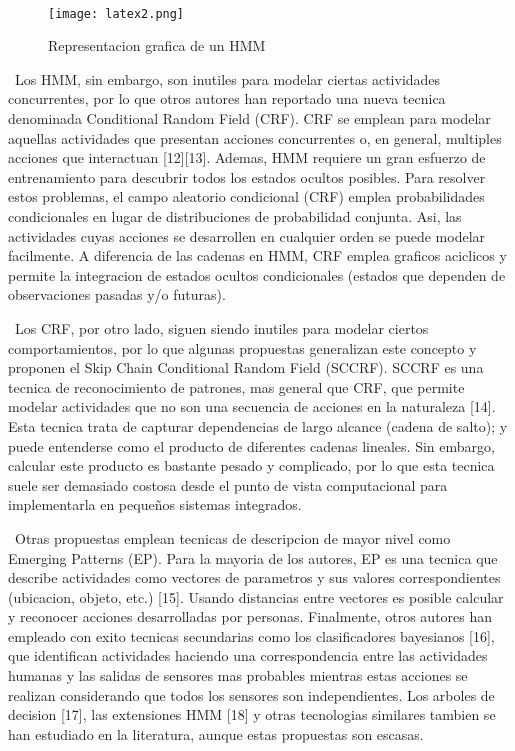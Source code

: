 \documentclass{paper}
\begin{document}
\ \begin{figure}[H]
    \centering
    \texttt{[image: latex2.png]}
    \caption{Representacion grafica de un HMM}
    \label{fig:my_label}
\end{figure}

\ Los HMM, sin embargo, son inutiles para modelar ciertas actividades concurrentes, por lo que otros autores han reportado una nueva tecnica denominada Conditional Random Field (CRF).
CRF se emplean para modelar aquellas actividades que presentan acciones concurrentes o, en
general, multiples acciones que interactuan [12][13]. Ademas, HMM requiere un gran esfuerzo de entrenamiento para descubrir todos los estados ocultos posibles. Para resolver estos problemas, el campo aleatorio condicional (CRF) emplea probabilidades condicionales en lugar de distribuciones de probabilidad conjunta. Asi, las actividades cuyas acciones se desarrollen en cualquier orden se puede modelar facilmente. A diferencia de las cadenas en HMM, CRF emplea graficos aciclicos y permite la integracion de estados ocultos condicionales (estados que dependen de observaciones pasadas y/o futuras). 




\ Los CRF, por otro lado, siguen siendo inutiles para modelar ciertos comportamientos, por lo que algunas propuestas generalizan este concepto y proponen el Skip Chain Conditional Random Field (SCCRF). SCCRF es una tecnica de reconocimiento de patrones, mas general que CRF, que permite modelar actividades que no son una secuencia de acciones en la naturaleza [14]. Esta tecnica trata de capturar dependencias de largo alcance (cadena de salto); y puede entenderse como el producto de diferentes cadenas lineales. Sin embargo, calcular este producto es bastante pesado y complicado, por lo que esta tecnica suele ser demasiado costosa desde el punto de vista computacional para implementarla en pequeños sistemas integrados. 

\ Otras propuestas emplean tecnicas de descripcion de mayor nivel como Emerging Patterns (EP). Para la mayoria de los autores, EP es una tecnica que describe actividades como vectores de parametros y sus valores correspondientes (ubicacion, objeto, etc.) [15]. Usando
distancias entre vectores es posible calcular y reconocer acciones desarrolladas por personas. Finalmente, otros autores han empleado con exito tecnicas secundarias como los clasificadores bayesianos [16], que identifican actividades haciendo una correspondencia entre las actividades humanas y las salidas de sensores mas probables mientras estas acciones
se realizan considerando que todos los sensores son independientes. Los arboles de decision [17], las extensiones HMM [18] y otras tecnologias similares tambien se han estudiado en la literatura, aunque estas propuestas son escasas. 
\end{document}
